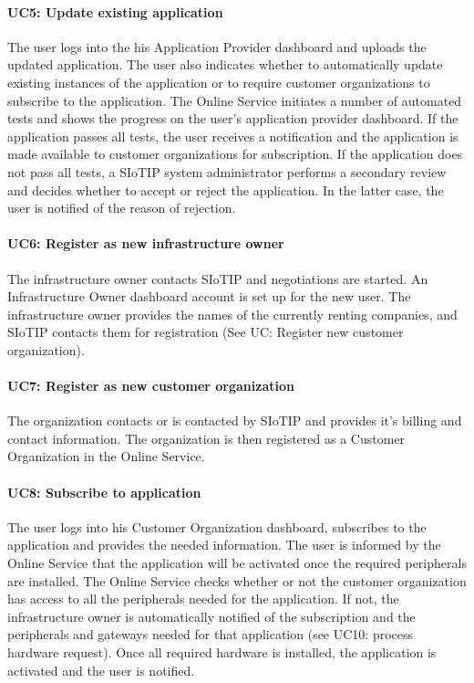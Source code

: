 \documentclass[english,peerreview]{sareport}
\begin{document}
\paragraph{UC5: Update existing application}
The user logs into the his Application Provider dashboard and uploads the updated application. The user also indicates whether to automatically update existing instances of the application or to require customer organizations to subscribe to the application. The Online Service initiates a number of automated tests and shows the progress on the user's application provider dashboard. If the application passes all tests, the user receives a notification and the application is made available to customer organizations for subscription. If the application does not pass all tests, a SIoTIP system administrator performs a secondary review and decides whether to accept or reject the application. In the latter case, the user is notified of the reason of rejection.

\paragraph{UC6: Register as new infrastructure owner}
The infrastructure owner contacts SIoTIP and negotiations are started. An Infrastructure Owner dashboard account is set up for the new user. The infrastructure owner provides the names of the currently renting companies, and SIoTIP contacts them for registration (See UC: Register new customer organization).

\paragraph{UC7: Register as new customer organization}
The organization contacts or is contacted by SIoTIP and provides it's billing and contact information. The organization is then registered as a Customer Organization in the Online Service.

\paragraph{UC8: Subscribe to application}
The user logs into his Customer Organization dashboard, subscribes to the application and provides the needed information. The user is informed by the Online Service that the application will be activated once the required peripherals are installed. The Online Service checks whether or not the customer organization has access to all the peripherals needed for the application. If not, the infrastructure owner is automatically notified of the subscription and the peripherals and gateways needed for that application (see UC10: process hardware request). Once all required hardware is installed, the application is activated and the user is notified.
\end{document}
